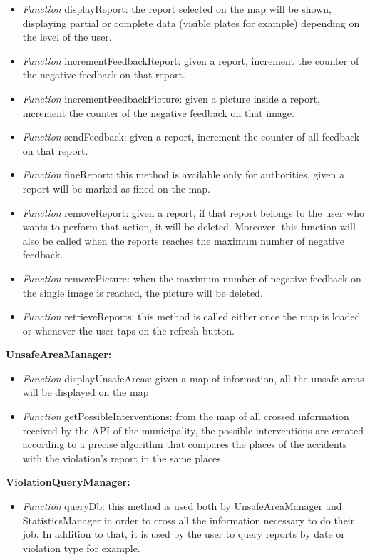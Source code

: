 \documentclass[../RASD.tex]{subfiles}
\begin{document}
    \begin{itemize}
        \item     \textit{Function} displayReport: the report selected on the map will be shown, displaying partial or complete data (visible plates for example)
        depending on the level of the user.
        \item     \textit{Function} incrementFeedbackReport: given a report, increment the counter of the negative feedback on that report.
        \item     \textit{Function} incrementFeedbackPicture: given a picture inside a report, increment the counter of the negative feedback on that image.
        \item     \textit{Function} sendFeedback: given a report, increment the counter of all feedback on that report.
        \item     \textit{Function} fineReport: this method is available only for authorities, given a report will be marked as fined on the map.
        \item     \textit{Function} removeReport: given a report, if that report belongs to the user who wants to perform that action, it will be deleted.
        Moreover, this function will also be called when the reports reaches the maximum number of negative feedback.
        \item     \textit{Function} removePicture: when the maximum number of negative feedback on the single image is reached, the picture will be deleted.
        \item     \textit{Function} retrieveReports: this method is called either once the map is loaded or whenever the user taps on the refresh button.
    \end{itemize}
    \textbf{UnsafeAreaManager:}
    \begin{itemize}
        \item     \textit{Function} displayUnsafeAreas: given a map of information, all the unsafe areas will be displayed on the map
        \item     \textit{Function} getPossibleInterventions: from the map of all crossed information received by the API of the municipality,
        the possible interventions are created according to a precise algorithm that compares the places of the accidents with the violation’s report
        in the same places.
    \end{itemize}
    \textbf{ViolationQueryManager:}
    \begin{itemize}
        \item     \textit{Function} queryDb: this method is used both by UnsafeAreaManager and StatisticsManager in order to cross all the information necessary to do their job.
        In addition to that, it is used by the user to query reports by date or violation type for example.
    \end{itemize}
    \newpage
\end{document}

